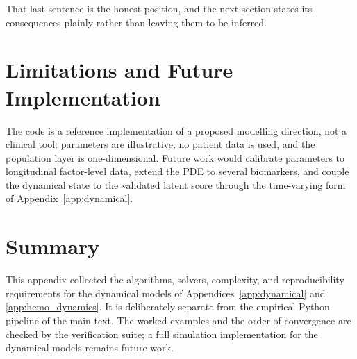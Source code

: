 That last sentence is the honest position, and the next section states its
consequences plainly rather than leaving them to be inferred.

\section{Limitations and Future Implementation}
\label{sec:D_limitations}
The code is a reference implementation of a proposed modelling direction, not a
clinical tool: parameters are illustrative, no patient data is used, and the
population layer is one-dimensional. Future work would calibrate parameters to
longitudinal factor-level data, extend the PDE to several biomarkers, and couple
the dynamical state to the validated latent score through the time-varying form
of Appendix~\ref{app:dynamical}.

\section{Summary}
\label{sec:D_summary}
This appendix collected the algorithms, solvers, complexity, and reproducibility
requirements for the dynamical models of Appendices~\ref{app:dynamical} and
\ref{app:hemo_dynamics}. It is deliberately separate from the empirical Python
pipeline of the main text. The worked examples and the order of convergence are
checked by the verification suite; a full simulation implementation for the
dynamical models remains future work.
